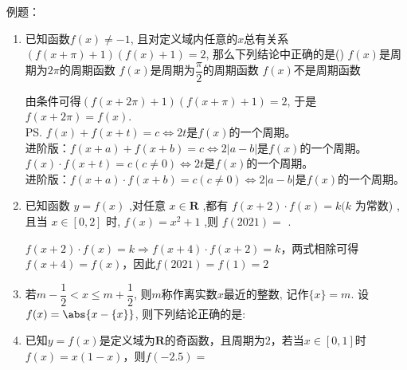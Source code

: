 例题：
\begin{enumerate}
    \item 已知函数$f(x)\neq -1$, 且对定义域内任意的$x$总有关系$(f(x+\pi)+1)(f(x)+1)=2$, 那么下列结论中正确的是\dotfill()
    {$f(x)$是周期为$2\pi$的周期函数}
    {$f(x)$是周期为$\dfrac{\pi}{2}$的周期函数}
    {$f(x)$不是周期函数}
    \begin{jieda}
    由条件可得$(f(x+2\pi)+1)(f(x+\pi)+1)=2$, 于是$f(x+2\pi)=f(x)$. \\
    \ps $f(x) + f(x+t) = c\Longleftrightarrow 2t$是$f(x)$的一个周期。\\
    进阶版：$f(x+a) + f(x+b) = c\Longleftrightarrow 2|a-b|$是$f(x)$的一个周期。 \\
    $f(x) \cdot f(x+t) = c (c \neq 0)\Longleftrightarrow 2t$是$f(x)$的一个周期。\\
    进阶版：$f(x+a) \cdot f(x+b) = c (c \neq 0)\Longleftrightarrow 2|a-b|$是$f(x)$的一个周期。
    \end{jieda}
    \item 已知函数 $y = f\left( x\right)$ ,对任意 $x \in  \mathbf{R}$ ,都有 $f\left( {x + 2}\right)  \cdot  f\left( x\right)  = k(k$ 为常数) ,且当 $x \in  \left\lbrack  {0,2}\right\rbrack$ 时, $f\left( x\right)  = {x}^{2} + 1$ ,则 $f\left( {2021}\right)  =$ .
    \begin{jieda}
        $f\left( {x + 2}\right)  \cdot  f\left( x\right)  = k \Longrightarrow f\left( {x + 4}\right)  \cdot  f\left( x+2\right)  = k$，两式相除可得$f(x+4) = f(x)$，因此$f(2021) = f(1) = 2$
    \end{jieda}
    \item 若$m-\dfrac{1}{2}<x\leq m+\dfrac{1}{2}$, 则$m$称作离实数$x$最近的整数, 记作$\{x\}=m$. 
    设$f(x)=\abs{x-\{x\}}$, 则下列结论正确的是:
    \item 已知$y = f(x)$是定义域为$\mathbf{R}$的奇函数，且周期为$2$，若当$x \in [0, 1]$时$f(x) = x(1-x)$，则$f(-2.5) = $

\end{enumerate}
